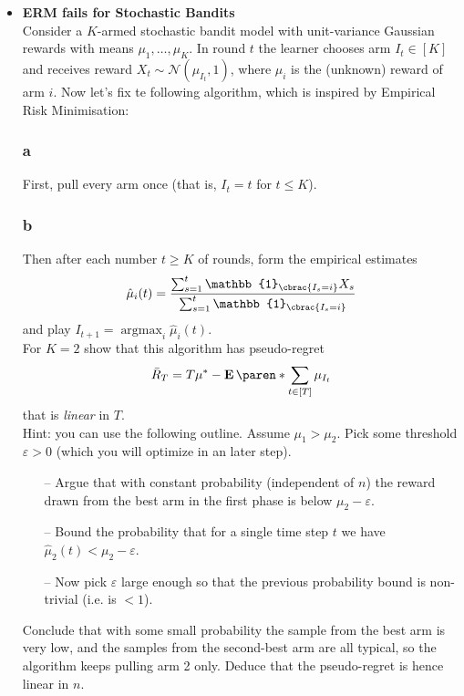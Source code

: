 \documentclass[10pt, a4paper, twoside]{amsart}
\theoremstyle{plain}
\DeclarePairedDelimiter\cbrac\{\}
\DeclarePairedDelimiter\paren()
\newcommand{\Ind}{\ensuremath{\mathbb{1}}}
\newcommand{\argmax}{\operatorname*{argmax}}
\newcommand{\Ev}{\operatorname*{\ensuremath{\mathbf{E}}}} %
\begin{document}
\begin{itemize}
    \item \textbf{ERM fails for Stochastic Bandits} \\
    Consider a $K$-armed stochastic bandit model with unit-variance Gaussian rewards with means $\mu_1,\ldots ,\mu_K$. In round $t$ the learner chooses arm $I_t \in [K]$ and receives reward $X_t \sim \mathcal{N}(\mu_{I_t}, 1)$, where $\mu_i$ is the (unknown) reward of arm $i$. Now let's fix te following algorithm, which is inspired by Empirical Risk Minimisation:
    \subsubsection*{a} First, pull every arm once (that is, $I_t = t$ for $t \leq K$).
    \subsubsection*{b} Then after each number $t \geq K$ of rounds, form the empirical estimates
    \begin{equation*}
        \hat{\mu}_i(t) = \frac{\sum_{s=1}^t \Ind_{\cbrac{I_s = i}} X_s}{\sum_{s=1}^t \Ind_{\cbrac{I_s =i}}}
    \end{equation*}
    and play $I_{t+1} = \argmax_i \hat{\mu}_i(t)$.\\
    For $K = 2$ show that this algorithm has pseudo-regret
    \begin{equation*}
        \bar{R}_T = T\mu^* - \Ev\paren*{\sum_{t \in [T]} \mu_{I_t}}
    \end{equation*}
    that is \textit{linear} in $T$.\\
    Hint: you can use the following outline. Assume $\mu_1 > \mu_2$. Pick some threshold $\varepsilon >0$ (which you will optimize in an later step).
    \begin{itemize}
        \item[--] Argue that with constant probability (independent of $n$) the reward drawn from the best arm in the first phase is below $\mu_2 - \varepsilon$.
        \item[--] Bound the probability that for a single time step $t$ we have $\hat{\mu}_2(t) < \mu_2 - \varepsilon$.
        \item[--] Now pick $\varepsilon$ large enough so that the previous probability bound is non-trivial (i.e. is $<1$).
    \end{itemize}
    Conclude that with some small probability the sample from the best arm is very low, and the samples from the second-best arm are all typical, so the algorithm keeps pulling arm 2 only. Deduce that the pseudo-regret is hence linear in $n$.
\end{itemize}
\end{document}
